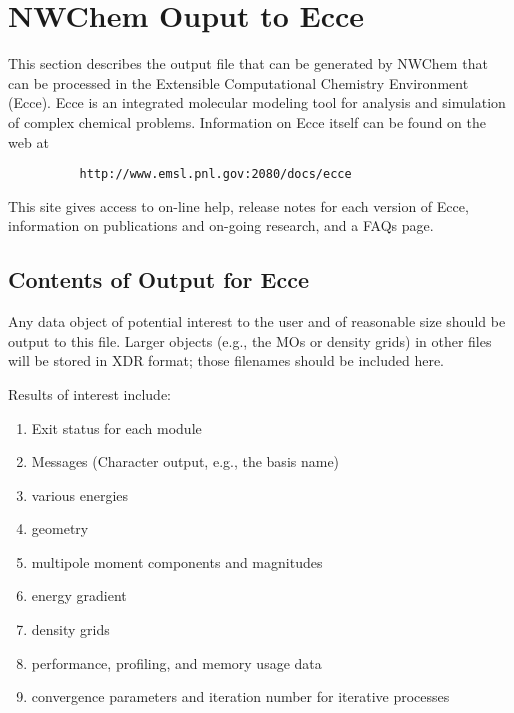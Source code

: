 %
%
\section{NWChem Ouput to Ecce}

This section describes the output file that can be generated by NWChem that
can be processed in the Extensible Computational Chemistry Environment (Ecce).
Ecce is an integrated molecular modeling tool for analysis and
simulation of complex chemical problems.  Information on Ecce itself
can be found on the web at 

\begin{verbatim}
          http://www.emsl.pnl.gov:2080/docs/ecce
\end{verbatim}

This
site gives access to on-line help, release notes for each version of
Ecce, information on publications and on-going research, and a FAQs page.

\subsection{Contents of Output for Ecce}
Any data object of potential interest to the user and of reasonable size
should be output to this file.  Larger objects (e.g., the MOs or density
grids) in other files will be stored in XDR format; those filenames should be 
included here.

Results of interest include:
\begin{enumerate}
\item  Exit status for each module
\item   Messages (Character output, e.g., the basis name)
\item  various energies
\item   geometry
\item  multipole moment components and magnitudes
\item   energy gradient
\item density grids
\item performance, profiling, and memory usage data
\item   convergence parameters and iteration number for iterative processes
\end{enumerate}

